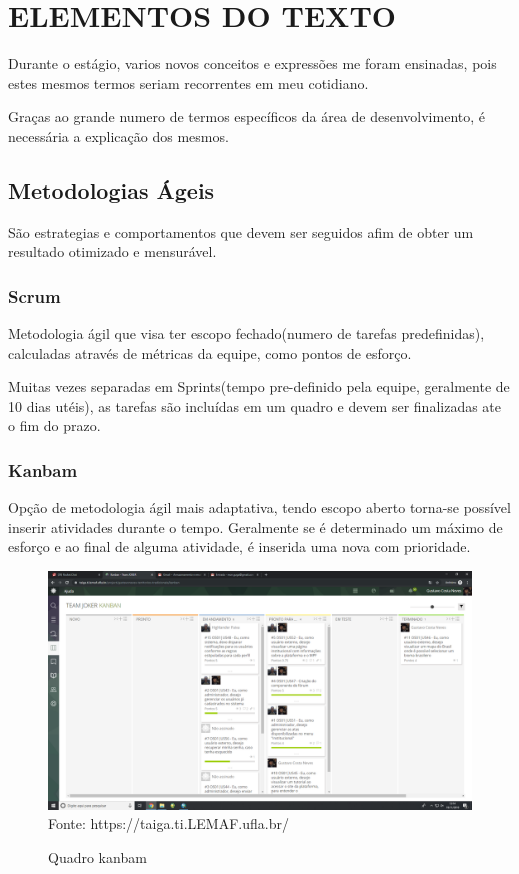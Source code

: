 \chapter{ELEMENTOS DO TEXTO}
\label{cap:elementos}

Durante o estágio, varios novos conceitos e expressões me foram ensinadas, pois estes mesmos termos seriam recorrentes em meu cotidiano.

Graças ao grande numero de termos específicos da área de desenvolvimento, é necessária a explicação dos mesmos.

\section{Metodologias Ágeis}

São estrategias e comportamentos que devem ser seguidos afim de obter um resultado otimizado e mensurável.

\subsection{Scrum}

Metodologia ágil que visa ter escopo fechado(numero de tarefas predefinidas), calculadas através de métricas da equipe, como pontos de esforço.

Muitas vezes separadas em Sprints(tempo pre-definido pela equipe, geralmente de 10 dias utéis), as tarefas são incluídas em um quadro e devem ser finalizadas ate o fim do prazo.

\subsection{Kanbam}
  Opção de metodologia ágil mais adaptativa, tendo escopo aberto torna-se possível inserir atividades durante o tempo.
  Geralmente se é determinado um máximo de esforço e ao final de alguma atividade, é inserida uma nova com prioridade.
\begin{figure}[H]
\centering
\caption{Quadro kanbam} %
\includegraphics[scale=0.2]{quadroKanbam}\\  %
{\small Fonte: https://taiga.ti.LEMAF.ufla.br/} %
\label{fig:exemplo} %
\end{figure}

